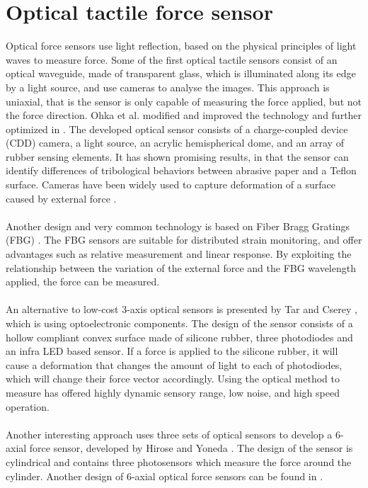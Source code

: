\documentclass[USenglish]{ifimaster}  %
\begin{document}
\section{Optical tactile force sensor}
Optical force sensors use light reflection, based on the physical principles of light waves to measure force. Some of the first optical tactile sensors \cite{220165,Nicholls1990} consist of an optical waveguide, made of transparent glass, which is illuminated along its edge by a light source, and use cameras to analyse the images. This approach is uniaxial, that is the sensor is only capable of measuring the force applied, but not the force direction. Ohka et al. \cite{525384} modified and improved the technology and further optimized in \cite{572232,ohka_mitsuya_matsunaga_takeuchi_2004,1545264}. The developed optical sensor consists of a charge-coupled device (CDD) camera, a light source, an acrylic hemispherical dome, and an array of rubber sensing elements. It has shown promising results, in that the sensor can identify differences of tribological behaviors between abrasive paper and a Teflon surface. Cameras have been widely used to capture deformation of a surface caused by external force \cite{1381228,7559098}.
\\
\\
Another design and very common technology is based on Fiber Bragg Gratings (FBG) \cite{Heo2006312}. The FBG sensors are suitable for distributed strain monitoring, and offer advantages such as relative measurement and linear response. By exploiting the relationship between the variation of the external force and the FBG wavelength applied, the force can be measured.
\\
\\ 
An alternative to low-cost 3-axis optical sensors is presented by Tar and Cserey \cite{6027100}, which is using optoelectronic components. The design of the sensor consists of a hollow compliant convex surface made of silicone rubber, three photodiodes and an infra LED based sensor.  If a force is applied to the silicone rubber, it will cause a deformation that changes the amount of light to each of photodiodes, which will change their force vector accordingly. Using the optical method to measure has offered highly dynamic sensory range, low noise, and high speed operation.
\\
\\
Another interesting approach uses three sets of optical sensors to develop a 6-axial force sensor, developed by Hirose and Yoneda \cite{125944}. The design of the sensor is cylindrical and contains three photosensors which measure the force around the cylinder. Another design of 6-axial optical force sensors can be found in \cite{6907805,6290303}.
\end{document}
